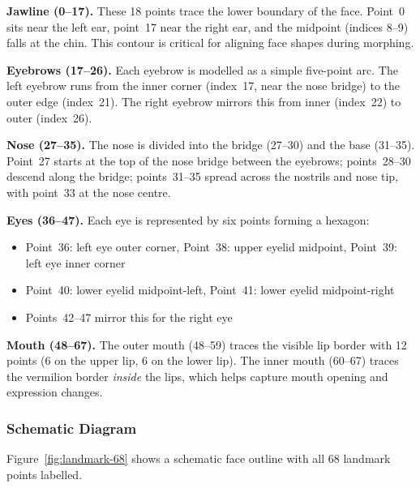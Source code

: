 \textbf{Jawline (0--17).} These 18 points trace the lower boundary of the face. Point~0 sits near the left ear, point~17 near the right ear, and the midpoint (indices 8--9) falls at the chin. This contour is critical for aligning face shapes during morphing.

\textbf{Eyebrows (17--26).} Each eyebrow is modelled as a simple five-point arc. The left eyebrow runs from the inner corner (index~17, near the nose bridge) to the outer edge (index~21). The right eyebrow mirrors this from inner (index~22) to outer (index~26).

\textbf{Nose (27--35).} The nose is divided into the bridge (27--30) and the base (31--35). Point~27 starts at the top of the nose bridge between the eyebrows; points~28--30 descend along the bridge; points~31--35 spread across the nostrils and nose tip, with point~33 at the nose centre.

\textbf{Eyes (36--47).} Each eye is represented by six points forming a hexagon:
\begin{itemize}
    \item Point~36: left eye outer corner, Point~38: upper eyelid midpoint, Point~39: left eye inner corner
    \item Point~40: lower eyelid midpoint-left, Point~41: lower eyelid midpoint-right
    \item Points~42--47 mirror this for the right eye
\end{itemize}

\textbf{Mouth (48--67).} The outer mouth (48--59) traces the visible lip border with 12 points (6 on the upper lip, 6 on the lower lip). The inner mouth (60--67) traces the vermilion border \emph{inside} the lips, which helps capture mouth opening and expression changes.

\subsubsection*{Schematic Diagram}

Figure~\ref{fig:landmark-68} shows a schematic face outline with all 68 landmark points labelled.

